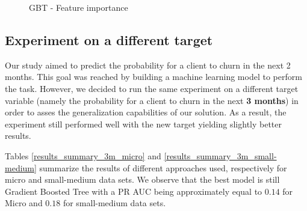\documentclass[LaM,binding=0.6cm, english]{sapthesis}
\begin{document}
\begin{figure}[!ht]
  \centering
  \hfill
  \caption{GBT - Feature importance}
\end{figure}

\subsection{Experiment on a different target}

Our study aimed to predict the probability for a client to churn in the next 2 months. This goal was reached by building a machine learning model to perform the task. However, we decided to run the same experiment on a different target variable (namely the probability for a client to churn in the next \textbf{3 months}) in order to asses the generalization capabilities of our solution. As a result, the experiment still performed well with the new target yielding slightly better results. 

Tables \ref{results_summary_3m_micro} and \ref{results_summary_3m_small-medium} summarize the results of different approaches used, respectively for micro and small-medium data sets. We observe that the best model is still Gradient Boosted Tree with a PR AUC being approximately equal to $0.14$ for Micro and $0.18$ for small-medium data sets.
\end{document}
